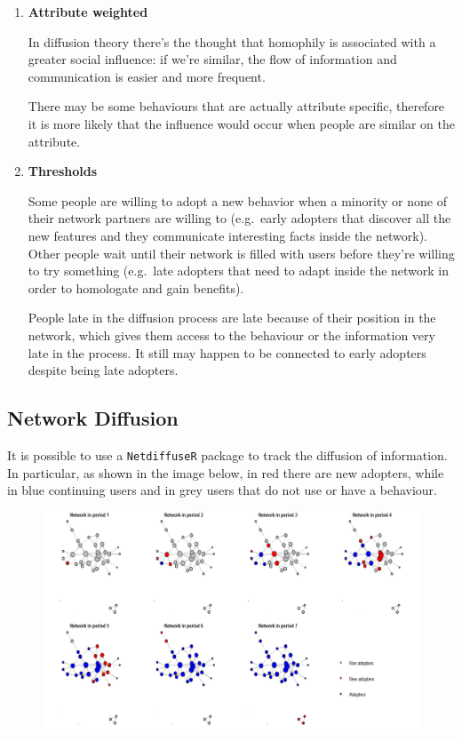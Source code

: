 \documentclass[
  notitlepage,
  onecolumn,
  openany]{book}
\begin{document}
\begin{enumerate}
\def\labelenumi{\arabic{enumi}.}
\setcounter{enumi}{8}
\item
  \textbf{Attribute weighted}

  In diffusion theory there's the thought that homophily is associated with a greater social influence: if we're similar, the flow of information and communication is easier and more frequent.

  There may be some behaviours that are actually attribute specific, therefore it is more likely that the influence would occur when people are similar on the attribute.
\item
  \textbf{Thresholds}

  Some people are willing to adopt a new behavior when a minority or none of their network partners are willing to (e.g.~early adopters that discover all the new features and they communicate interesting facts inside the network). Other people wait until their network is filled with users before they're willing to try something (e.g.~late adopters that need to adapt inside the network in order to homologate and gain benefits).

  People late in the diffusion process are late because of their position in the network, which gives them access to the behaviour or the information very late in the process. It still may happen to be connected to early adopters despite being late adopters.
\end{enumerate}

\hypertarget{network-diffusion}{%
\subsection{Network Diffusion}\label{network-diffusion}}

It is possible to use a \texttt{NetdiffuseR} package to track the diffusion of information. In particular, as shown in the image below, in red there are new adopters, while in blue continuing users and in grey users that do not use or have a behaviour.

\begin{figure}[h!]

{\centering \includegraphics[width=0.5\linewidth]{images/14-Christakis and Valente/Untitled 5} 

}

\end{figure}
\end{document}
